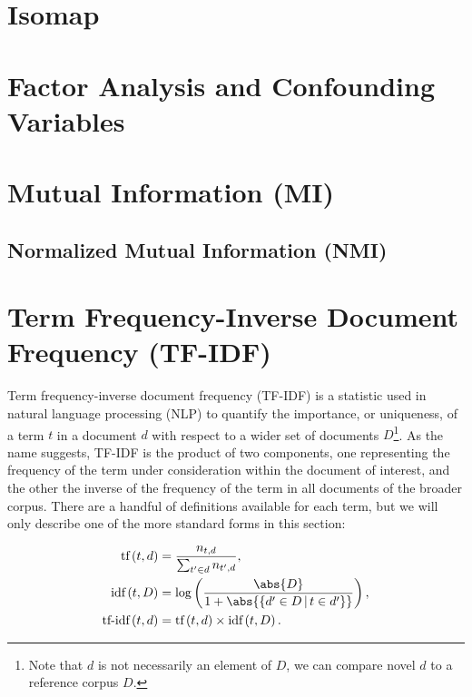 \section{Isomap}
\label{dim_reduct:isomap}

\section{Factor Analysis and Confounding Variables}
\label{dim_reduct:factor_ana}

\section{Mutual Information (MI)}
\label{dim_reduct:MI}

\subsection{Normalized Mutual Information (NMI)}
\label{dim_reduct:MI:normalized}

\section{Term Frequency-Inverse Document Frequency (TF-IDF)}
\label{dim_reduct:tfidf}

Term frequency-inverse document frequency (TF-IDF) is a statistic
used in natural language processing (NLP) to quantify
the importance, or uniqueness, of a term $t$ in a document $d$
with respect to a wider set of documents $D$\footnote{Note that $d$ is not necessarily an element of $D$, we can compare novel $d$ to a reference corpus $D$.}.
As the name suggests, TF-IDF is the product of two components,
one representing the frequency of the term under consideration within the document of interest,
and the other the inverse of the frequency of the term in all documents of the broader corpus.
There are a handful of definitions available for each term, but we will only describe
one of the more standard forms in this section:

\begin{subequations}\label{eq:unsupervised:tfidf}
\begin{align}
\text{tf}\left(t,d\right) &= \frac{n_{t,d}}{\sum_{t' \in d} n_{t',d}}, \label{eq:unsupervised:tfidf:tf} \\
\text{idf}\left(t,D\right) &= \log\left(\frac{\abs{D}}{1 + \abs{\left\{d' \in D \, | \, t \in d'\right\}}}\right), \label{eq:unsupervised:tfidf:idf} \\
\text{tf-idf}\left(t,d\right) &= \text{tf}\left(t,d\right) \times \text{idf}\left(t,D\right). \label{eq:unsupervised:tfidf:tfidf}
\end{align}
\end{subequations}

